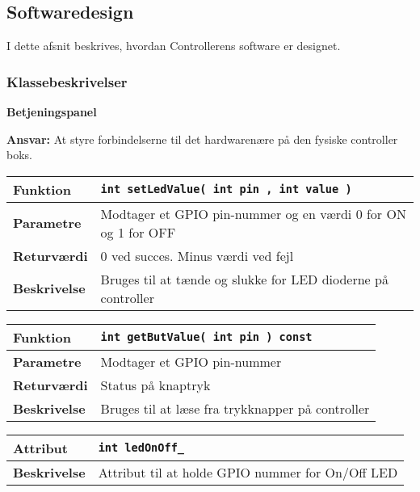\subsection{Softwaredesign}

I dette afsnit beskrives, hvordan Controllerens software er designet.

\subsubsection*{Klassebeskrivelser}


{\centering
\textbf{Betjeningspanel}\par
}
\textbf{Ansvar:} At styre forbindelserne til det hardwarenære på den fysiske controller boks. \

\begin{center}
    \begin{tabular}{ | l | p{} |}
    \hline
    \textbf{Funktion}	& \verb+int setLedValue( int pin , int value ) +						\\ \hline
    \textbf{Parametre} 	& Modtager et GPIO pin-nummer og en værdi 0 for ON og 1 for OFF		\\ \hline
    \textbf{Returværdi}	& 0 ved succes. Minus værdi ved fejl 								\\ \hline
    \textbf{Beskrivelse}	& Bruges til at tænde og slukke for LED dioderne på controller		\\ \hline
    \end{tabular}
\end{center}

\begin{center}
    \begin{tabular}{ | l | p{} |}
    \hline
    \textbf{Funktion}	& \verb+int getButValue( int pin ) const +						\\ \hline
    \textbf{Parametre} 	& Modtager et GPIO pin-nummer									\\ \hline
    \textbf{Returværdi}	& Status på knaptryk 											\\ \hline
    \textbf{Beskrivelse}	& Bruges til at læse fra trykknapper på controller				\\ \hline
    \end{tabular}
\end{center}

\begin{center}
    \begin{tabular}{ | l | p{} |}
    \hline
    \textbf{Attribut}		& \verb+int ledOnOff_ +									\\ \hline
    \textbf{Beskrivelse} 	& Attribut til at holde GPIO nummer for On/Off LED		\\ \hline
    \end{tabular}
\end{center}

